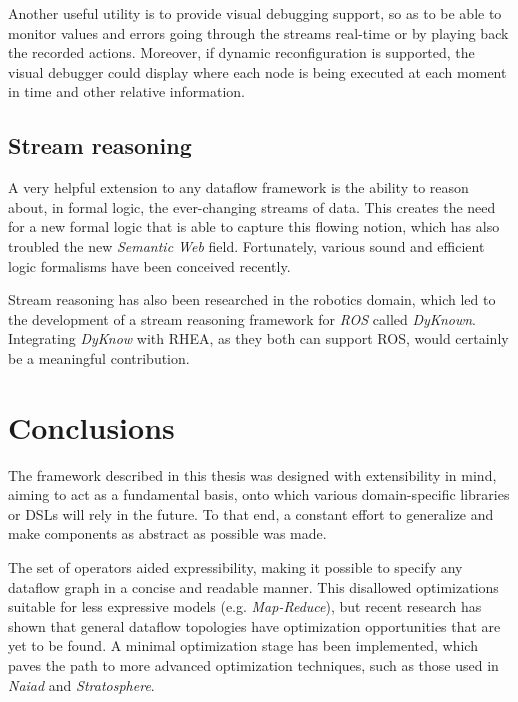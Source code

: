 \documentclass[sigplan,review,anonymous]{acmart}
\begin{document}
Another useful utility is to provide visual debugging support, so as to be able
to monitor values and errors going through the streams real-time or by playing
back the recorded actions. Moreover, if dynamic reconfiguration is supported,
the visual debugger could display where each node is being executed at each
moment in time and other relative information.

\subsection{Stream reasoning}

A very helpful extension to any dataflow framework is the ability to reason
about, in formal logic, the ever-changing streams of data. This creates the need
for a new formal logic that is able to capture this flowing notion, which has
also troubled the new \textit{Semantic Web} field\cite{streaming_world}.
Fortunately, various sound and efficient logic formalisms have been conceived
recently\cite{pdt_logic,asp}.

Stream reasoning has also been researched in the robotics
domain\cite{robot_reasoning}, which led to the development of a stream reasoning
framework for \textit{ROS} called \textit{DyKnown}\cite{stream_reasoning}.
Integrating \textit{DyKnow} with \textsc{RHEA}, as they both can support ROS,
would certainly be a meaningful contribution.

\section{Conclusions} \label{sec:conclusions}

The framework described in this thesis was designed with extensibility in mind,
aiming to act as a fundamental basis, onto which various domain-specific
libraries or DSLs will rely in the future. To that end, a constant effort to
generalize and make components as abstract as possible was made.

The set of operators aided expressibility, making it possible to specify any
dataflow graph in a concise and readable manner. This disallowed optimizations
suitable for less expressive models (e.g. \textit{Map-Reduce}), but recent
research has shown that general dataflow topologies have optimization
opportunities that are yet to be found\cite{blackbox}. A minimal optimization
stage has been implemented, which paves the path to more advanced optimization
techniques, such as those used in \textit{Naiad}\cite{naiad} and
\textit{Stratosphere}\cite{static_analysis}.
\end{document}
